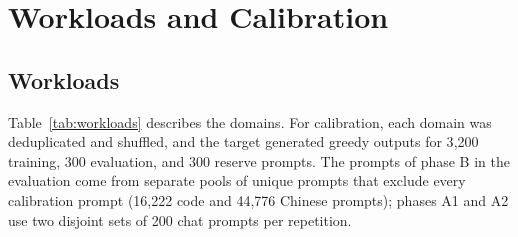 \documentclass{article}
\begin{document}
\FloatBarrier
\section{Workloads and Calibration}\label{app:calibration}

\subsection{Workloads}\label{app:workloads}

Table~\ref{tab:workloads} describes the domains. For calibration, each domain was deduplicated and shuffled, and the target generated greedy outputs for 3{,}200 training, 300 evaluation, and 300 reserve prompts. The prompts of phase B in the evaluation come from separate pools of unique prompts that exclude every calibration prompt (16{,}222 code and 44{,}776 Chinese prompts); phases A1 and A2 use two disjoint sets of 200 chat prompts per repetition.
\end{document}
